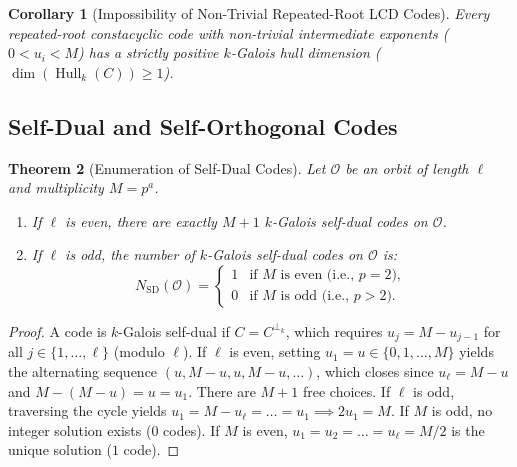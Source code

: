 \documentclass[preprint,12pt]{elsarticle}
\numberwithin{equation}{section}
\theoremstyle{plain}
\newtheorem{theorem}{Theorem}[section]
\newtheorem{corollary}[theorem]{Corollary}
\theoremstyle{definition}
\theoremstyle{remark}
\begin{document}
\begin{corollary}[Impossibility of Non-Trivial Repeated-Root LCD Codes]
Every repeated-root constacyclic code with non-trivial intermediate exponents ($0 < u_i < M$) has a strictly positive $k$-Galois hull dimension ($\dim(\operatorname{Hull}_k(C)) \ge 1$).
\end{corollary}

\subsection{Self-Dual and Self-Orthogonal Codes}

\begin{theorem}[Enumeration of Self-Dual Codes]\label{thm:self_dual}
Let $\mathcal{O}$ be an orbit of length $\ell$ and multiplicity $M = p^a$.
\begin{enumerate}
    \item If $\ell$ is even, there are exactly $M+1$ $k$-Galois self-dual codes on $\mathcal{O}$.
    \item If $\ell$ is odd, the number of $k$-Galois self-dual codes on $\mathcal{O}$ is:
    \begin{equation}
        N_{\mathrm{SD}}(\mathcal{O}) = \begin{cases}
            1 & \text{if } M \text{ is even (i.e., } p = 2\text{)}, \\
            0 & \text{if } M \text{ is odd (i.e., } p > 2\text{)}.
        \end{cases}
    \end{equation}
\end{enumerate}
\end{theorem}
\begin{proof}
A code is $k$-Galois self-dual if $C = C^{\perp_k}$, which requires $u_j = M - u_{j-1}$ for all $j \in \{1, \dots, \ell\}$ (modulo $\ell$). 
If $\ell$ is even, setting $u_1 = u \in \{0, 1, \dots, M\}$ yields the alternating sequence $(u, M-u, u, M-u, \dots)$, which closes since $u_\ell = M - u$ and $M - (M-u) = u = u_1$. There are $M+1$ free choices.
If $\ell$ is odd, traversing the cycle yields $u_1 = M - u_\ell = \dots = u_1 \implies 2 u_1 = M$. If $M$ is odd, no integer solution exists ($0$ codes). If $M$ is even, $u_1 = u_2 = \dots = u_\ell = M/2$ is the unique solution ($1$ code).
\end{proof}
\end{document}
